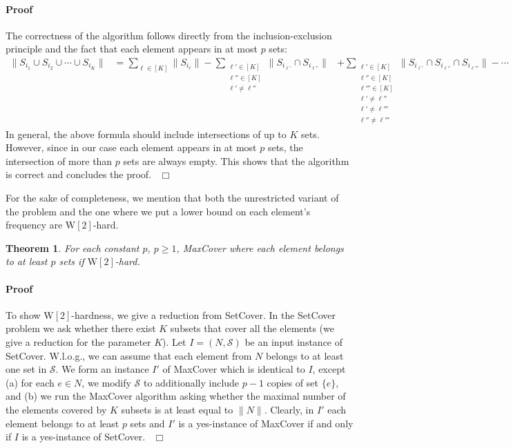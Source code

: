 \documentclass[11pt]{article}
\newtheorem{theorem}{Theorem}
\newenvironment{proof}{\paragraph{Proof}}{\hfill$\Box$\medskip}
\newcommand{\wtwo}{{\mathrm{W[2]}}}
\newcommand{\calS}{{{\mathcal{S}}}}
\begin{document}
\begin{proof}
  The correctness of the algorithm follows directly from the inclusion-exclusion
  principle and the fact that each element appears in at most $p$ sets: 
\begin{align*}
    \| S_{i_1} \cup S_{i_2} \cup \cdots \cup S_{i_K}\| &= \sum_{\ell \in [K]}\|S_{i_\ell}\| 
      -\!\!\! \sum_{\substack{\ell' \in [K] \\ \ell'' \in [K] \\ \ell' \neq \ell''}}\|S_{i_{\ell'}}\cap S_{i_{\ell''}}\| 
      &+ \sum_{\substack{\ell' \in [K]\\ \ell'' \in [K]\\ \ell''' \in [K] \\ \ell' \neq \ell'' \\ \ell' \neq \ell''' \\ \ell'' \neq \ell'''}}\|S_{i_{\ell'}}\cap S_{i_{\ell''}} \cap S_{i_{\ell'''}}\| 
      - \cdots 
  \end{align*}
In general, the above formula should include intersections of up to
  $K$ sets. However, since in our case each element appears in at most
  $p$ sets, the intersection of more than $p$ sets are always
  empty. This shows that the algorithm is correct and concludes the
  proof.~
\end{proof}

For the sake of completeness, we mention that both the unrestricted
variant of the problem and the one where we put a lower bound on each
element's frequency are $\wtwo$-hard.

\begin{theorem}
  For each constant $p$, $p \geq 1$, MaxCover where each element
  belongs to at least $p$ sets if $\wtwo$-hard.
\end{theorem}
\begin{proof}
  To show $\wtwo$-hardness, we give a reduction from SetCover. In the SetCover
  problem we ask whether there exist $K$ subsets that cover all the elements
  (we give a reduction for the parameter $K$).
  Let $I = (N,\calS)$ be an input instance of
  SetCover.  W.l.o.g., we can assume that each element from $N$
  belongs to at least one set in $\calS$. We form an instance $I'$ of
  MaxCover which is identical to $I$, except (a) for each $e \in N$,
  we modify $\calS$ to  additionally include $p-1$ copies of set $\{e\}$, and
  (b) we run the MaxCover algorithm asking whether the maximal number of the
  elements covered by $K$ subsets is at least equal to $\|N\|$.
  Clearly, in $I'$ each element belongs to at least $p$ sets
  and $I'$ is a yes-instance of MaxCover if and only if $I$ is a
  yes-instance of SetCover.~
\end{proof}
\end{document}
